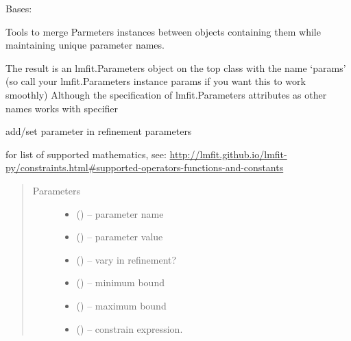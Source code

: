 \documentclass[letterpaper,10pt,english]{sphinxmanual}
\begin{document}
\begin{fulllineitems}
\label{\detokenize{rst/utilities:mstack.utilities.MergeParams}}
Bases: 

Tools to merge Parmeters instances between objects containing them while
maintaining unique parameter names.

The result is an lmfit.Parameters object on the top class with the name `params'
(so call your lmfit.Parameters instance params if you want this to work smoothly)
Although the specification of lmfit.Parameters attributes as other names works
with specifier

\begin{fulllineitems}
\label{\detokenize{rst/utilities:mstack.utilities.MergeParams.add_set_params}}
add/set parameter in refinement parameters

for list of supported mathematics, see:
\url{http://lmfit.github.io/lmfit-py/constraints.html\#supported-operators-functions-and-constants}
\begin{quote}\begin{description}
\item[{Parameters}] \leavevmode\begin{itemize}
\item {} 
 () -- parameter name

\item {} 
 () -- parameter value

\item {} 
 () -- vary in refinement?

\item {} 
 () -- minimum bound

\item {} 
 () -- maximum bound

\item {} 
 () -- constrain expression.


\end{itemize}
\end{description}
\end{quote}
\end{fulllineitems}
\end{fulllineitems}
\end{document}
